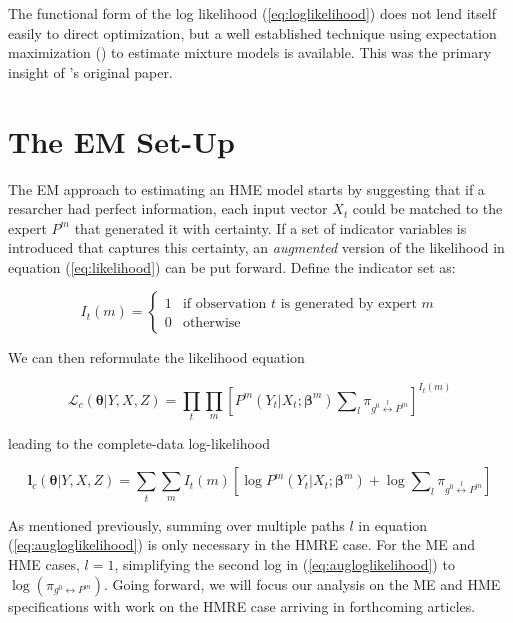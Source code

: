 \documentclass[12pt]{article}
\newcommand{\gateprod}[2]{\pi_{#1 \longleftrightarrow #2}}
\newcommand{\sumgateprod}[3]{\pi_{#1 \overset{#3}{\longleftrightarrow} #2}}
\newcommand{\shortsum}[1]{\sum \nolimits_{#1}}
\begin{document}
The functional form of the log likelihood (\ref{eq:loglikelihood}) does not
lend itself easily to direct optimization, but a well established
technique using expectation maximization (\cite{EM_DLR1977}) to estimate mixture
models is available. This was the primary insight of \cite{JordanJacobs1993}'s
original paper.


\section{The EM Set-Up} \label{sec:Estimation}

The EM approach to estimating an HME model starts by suggesting that if a
resarcher had perfect information, each input vector $X_{t}$ could be matched
to the expert $P^{m}$ that generated it with certainty. If a set of indicator
variables is introduced that captures this certainty, an \textit{augmented}
version of the likelihood in equation (\ref{eq:likelihood}) can be put forward.
Define the indicator set as:

\begin{equation} \label{eq:indicator}
  I_{t}(m) = \begin{cases} 
     1 & \textrm{if observation $t$ is generated by expert $m$} \\
     0 & \textrm{otherwise}
             \end{cases}
\end{equation}

We can then reformulate the likelihood equation

\begin{equation}  \label{eq:auglikelihood}
  \mathcal{L}_{c}(\boldsymbol{\theta}|Y, X, Z) = \prod_{t} \prod_{m} \left[ P^{m}(Y_{t}|X_{t}; \boldsymbol{\beta}^{m}) \shortsum{l} \sumgateprod{g^{0}}{P^{m}}{l} \right]^{I_{t}(m)}
\end{equation}

leading to the complete-data log-likelihood

\begin{equation}  \label{eq:augloglikelihood}
  \boldsymbol{l}_{c}(\boldsymbol{\theta}|Y, X, Z) = \sum_{t} \sum_{m} I_{t}(m) \left[\log P^{m}(Y_{t}|X_{t}; \boldsymbol{\beta}^{m}) + \log \shortsum{l} \sumgateprod{g^{0}}{P^{m}}{l} \right]
\end{equation}

As mentioned previously, summing over multiple paths $l$ in equation
(\ref{eq:augloglikelihood}) is only necessary in the HMRE case. For the ME
and HME cases, $l = 1$, simplifying the second log in (\ref{eq:augloglikelihood})
to $\log(\gateprod{g^{0}}{P^{m}})$. Going forward, we will focus our analysis on
the ME and HME specifications with work on the HMRE case arriving in forthcoming
articles.
\end{document}
